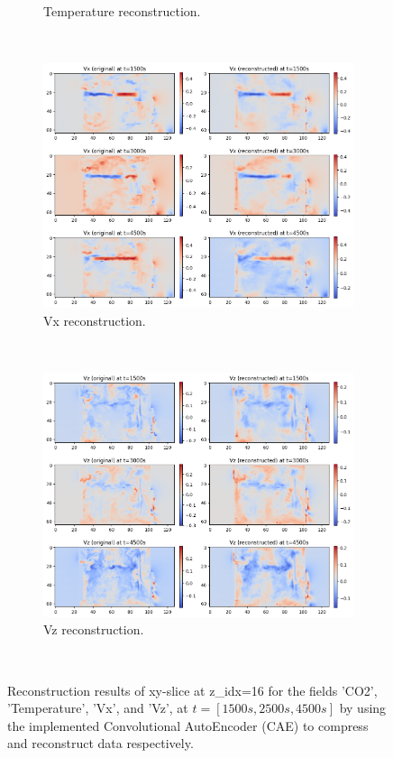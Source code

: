 \documentclass[final-report]{article-template}
\begin{document}
\begin{figure}[!htb]
\begin{subfigure}[t]{0.49\textwidth}
        \caption{Temperature reconstruction.}
        \label{fig:temp_recon}
    \end{subfigure} \\[5mm]
    \begin{subfigure}[t]{0.49\textwidth}
        \centering
        \includegraphics[width=\textwidth]{figures/vx_recon.png}
        \caption{Vx reconstruction.}
        \label{fig:vx_recon}
    \end{subfigure} \
        \begin{subfigure}[t]{0.49\textwidth}
        \centering
        \includegraphics[width=\textwidth]{figures/vz_recon.png}
        \caption{Vz reconstruction.}
        \label{fig:vz_recon}
    \end{subfigure} \\
    \caption{Reconstruction results of xy-slice at z\_idx=16 for the fields 'CO2', 'Temperature', 'Vx', and 'Vz', at $t=[1500s, 2500s, 4500s]$  by using the implemented Convolutional AutoEncoder (CAE) to compress and reconstruct data respectively.}
    \label{fig:cae_recon_results}
\end{figure}
\end{document}
